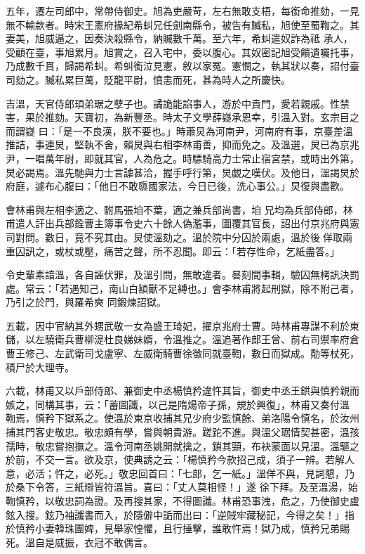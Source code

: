 \begin{pinyinscope}
 五年，遷左司郎中，常帶侍御史。旭為吏嚴苛，左右無敢支梧，每銜命推劾，一見無不輸款者。時宋王憲府掾紀希虯兄任劍南縣令，被告有贓私，旭使至蜀鞫之。其妻美，旭威逼之，因奏決殺縣令，納贓數千萬。至六年，希虯遣奴詐為祗
 承人，受顧在臺，事旭累月。旭賞之，召入宅中，委以腹心。其奴密記旭受饋遺囑托事，乃成數千貫，歸謁希虯。希虯銜泣見憲，敘以家冤。憲憫之，執其狀以奏，詔付臺司劾之。贓私累巨萬，貶龍平尉，憤恚而死，甚為時人之所慶快。



 吉溫，天官侍郎頊弟琚之孽子也。譎詭能諂事人，游於中貴門，愛若親戚。性禁害，果於推劾。天寶初，為新豐丞。時太子文學薛嶷承恩幸，引溫入對。玄宗目之而謂嶷
 曰：「是一不良漢，朕不要也。」時蕭炅為河南尹，河南府有事，京臺差溫推詰，事連炅，堅執不舍，賴炅與右相李林甫善，抑而免之。及溫選，炅已為京兆尹，一唱萬年尉，即就其官，人為危之。時驃騎高力士常止宿宮禁，或時出外第，炅必謁焉。溫先馳與力士言謔甚洽，握手呼行第，炅覷之嘆伏。及他日，溫謁炅於府庭，遽布心腹曰：「他日不敢隳國家法，今日已後，洗心事公。」炅復與盡歡。



 會林甫與左相李適之、駙馬張垍不葉，適之兼兵部尚書，垍
 兄均為兵部侍郎，林甫遣人訐出兵部銓曹主簿事令史六十餘人偽濫事，圖覆其官長，詔出付京兆府與憲司對問。數日，竟不究其由。炅使溫劾之。溫於院中分囚於兩處，溫於後佯取兩重囚訊之，或杖或壓，痛苦之聲，所不忍聞。即云：「若存性命，乞紙盡答。」



 令史輩素諳溫，各自誣伏罪，及溫引問，無敢違者。晷刻間事輯，驗囚無栲訊決罰處。常云：「若遇知己，南山白額獸不足縛也。」會李林甫將起刑獄，除不附己者，乃引之於門，與羅希奭
 同鍛煉詔獄。



 五載，因中官納其外甥武敬一女為盛王琦妃，擢京兆府士曹。時林甫專謀不利於東儲，以左驍衛兵曹柳湜杜良娣妹婿，令溫推之。溫追著作郎王曾、前右司禦率府倉曹王修己、左武衛司戈盧寧、左威衛騎曹徐徵同就臺鞫，數日而獄成。勣等杖死，積尸於大理寺。



 六載，林甫又以戶部侍郎、兼御史中丞楊慎矜違忤其旨，御史中丞王鉷與慎矜親而嫉之，同構其事，云：「蓄圖讖，以己是隋煬帝子孫，規於興復」，林甫又奏付溫
 鞫焉，慎矜下獄系之。使溫於東京收捕其兄少府少監慎餘、弟洛陽令慎名，於汝州捕其門客史敬忠。敬忠頗有學，嘗與朝貴游。蹉跎不進。與溫父琚情契甚密，溫孩孺時，敬忠嘗抱撫之。溫令河南丞姚開就擒之，鎖其頸，布袂蒙面以見溫。溫驅之於前，不交一言。欲及京，使典誘之云：「楊慎矜今款招己成，須子一辨。若解人意，必活；忤之，必死。」敬忠回首曰：「七郎，乞一紙。」溫佯不與，見詞懇，乃於桑下令答，三紙辯皆符溫旨。喜曰：「丈人莫相怪！」遂
 徐下拜。及至溫湯，始鞫慎矜，以敬忠詞為證。及再搜其家，不得圖讖。林甫恐事洩，危之，乃使御史盧鉉入搜。鉉乃袖讖書而入，於隱僻中詬而出曰：「逆賊牢藏秘記，今得之矣！」指於慎矜小妻韓珠團婢，見舉家惶懼，且行捶擊，誰敢忤焉！獄乃成，慎矜兄弟賜死。溫自是威振，衣冠不敢偶言。




\end{pinyinscope}
